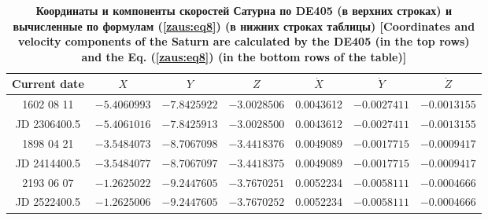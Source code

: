 \begin{table}
\center \small
\begin{minipage}[t]{160mm}
\centering
\caption{\bf Координаты и компоненты скоростей Сатурна по DE405 (в верхних строках) и вычисленные по формулам  (\ref{zaus:eq8}) (в нижних строках таблицы) [Coordinates and velocity components of the Saturn are calculated by the  DE405 (in the top rows) and the Eq. (\ref{zaus:eq8}) (in the bottom rows of the table)]
\vspace{-3mm}}
\begin{tabular}{|c|r|r|r|r|r|r|}
\hline
\footnotesize
\rule{0mm}{12pt}%
Current date & \multicolumn{1}{c|}{\footnotesize $X$}&	\multicolumn{1}{c|}{\footnotesize $Y$}&	\multicolumn{1}{c|}{\footnotesize $Z$}&	\multicolumn{1}{c|}{\footnotesize $\dot{X}$}&	\multicolumn{1}{c|}{\footnotesize $\dot{Y}$}&	\multicolumn{1}{c|}{\footnotesize$\dot{Z}$}\\ \hline
\rule{0mm}{14pt}%
1602 08 11&	$-5.4060993$&	$-7.8425922$&	$-3.0028506$&	0.0043612&	$-0.0027411$&	 $ -0.0013155$\\
JD 2306400.5&	$-5.4061016$&	$-7.8425913$&	$-3.0028500$&	0.0043612&	$-0.0027411$&	  $-0.0013155$\\ \hline
1898 04 21&	$-3.5484073$&	$-8.7067098$&	$-3.4418376$&	0.0049089&	$-0.0017715$&	 $-0.0009417$\\
JD 2414400.5&	$-3.5484077$&	$-8.7067097$&	$-3.4418375$&	0.0049089&	$-0.0017715$&	 $-0.0009417$\\ \hline
2193 06 07&	$-1.2625022$&	$-9.2447605$&	$-3.7670251$&	0.0052234&	$-0.0058111$&	$-0.0004666$ \\
JD 2522400.5&	$-1.2625006$&	$-9.2447605$&	$-3.7670252$&	0.0052234&	$-0.0058111$&	$-0.0004666$ \\ \hline
\end{tabular}
\label{table:zausaev:tabl10}

\vspace{5mm}



\end{minipage}
\end{table}
